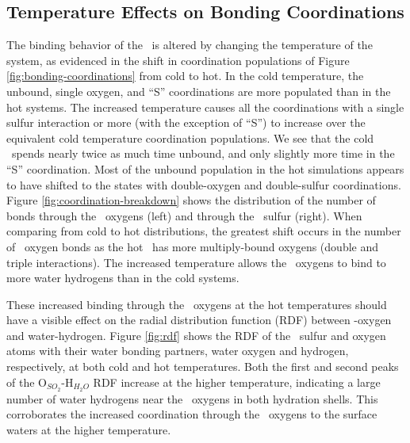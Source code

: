 

\subsection {Temperature Effects on Bonding Coordinations}

The binding behavior of the \suldiox~is altered by changing the temperature of the system, as evidenced in the shift in coordination populations of Figure \ref{fig:bonding-coordinations} from cold to hot. In the cold temperature, the unbound, single oxygen, and ``S'' coordinations are more populated than in the hot systems. The increased temperature causes all the coordinations with a single sulfur interaction or more (with the exception of ``S'') to increase over the equivalent cold temperature coordination populations. We see that the cold \suldiox~spends nearly twice as much time unbound, and only slightly more time in the ``S'' coordination. Most of the unbound population in the hot simulations appears to have shifted to the states with double-oxygen and double-sulfur coordinations. Figure \ref{fig:coordination-breakdown} shows the distribution of the number of bonds through the \suldiox~oxygens (left) and through the \suldiox~sulfur (right). When comparing from cold to hot distributions, the greatest shift occurs in the number of \suldiox~oxygen bonds as the hot \suldiox~has more multiply-bound oxygens (double and triple interactions). The increased temperature allows the \suldiox~oxygens to bind to more water hydrogens than in the cold systems.

These increased binding through the \suldiox~oxygens at the hot temperatures should have a visible effect on the radial distribution function (RDF) between \suldiox-oxygen and water-hydrogen. Figure \ref{fig:rdf} shows the RDF of the \suldiox~sulfur and oxygen atoms with their water bonding partners, water oxygen and hydrogen, respectively, at both cold and hot temperatures. Both the first and second peaks of the O$_{SO_2}$-H$_{H_2O}$ RDF increase at the higher temperature, indicating a large number of water hydrogens near the \suldiox~oxygens in both hydration shells. This corroborates the increased coordination through the \suldiox~oxygens to the surface waters at the higher temperature.

